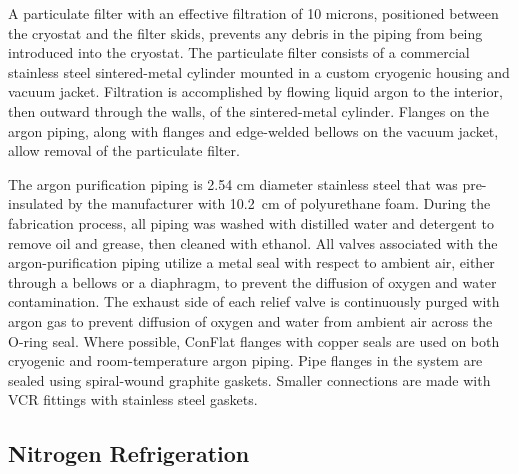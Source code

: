 A particulate filter with an effective filtration of 10 microns, positioned between the cryostat and the filter skids, prevents any debris in the piping from being introduced into the cryostat.  The particulate filter consists of a commercial stainless steel sintered-metal cylinder mounted in a custom cryogenic housing and vacuum jacket.  Filtration is accomplished by flowing liquid argon to the interior, then outward through the walls, of the sintered-metal cylinder.  Flanges on the argon piping, along with flanges and edge-welded bellows on the vacuum jacket, allow removal of the particulate filter.  




The argon purification piping is 2.54 cm diameter stainless steel that was pre-insulated by the manufacturer with 10.2~cm of polyurethane foam.  During the fabrication process, all piping was washed with distilled water and detergent to remove oil and grease, then cleaned with ethanol.  All valves associated with the argon-purification piping utilize a metal seal with respect to ambient air, either through a bellows or a diaphragm, to prevent the diffusion of oxygen and water contamination.  The exhaust side of each relief valve is continuously purged with argon gas to prevent diffusion of oxygen and water from ambient air across the O-ring seal.  Where possible, ConFlat flanges with copper seals are used on both cryogenic and room-temperature argon piping.  Pipe flanges in the system are sealed using spiral-wound graphite gaskets.  Smaller connections are made with VCR fittings with stainless steel gaskets.  

\subsection{Nitrogen Refrigeration}

